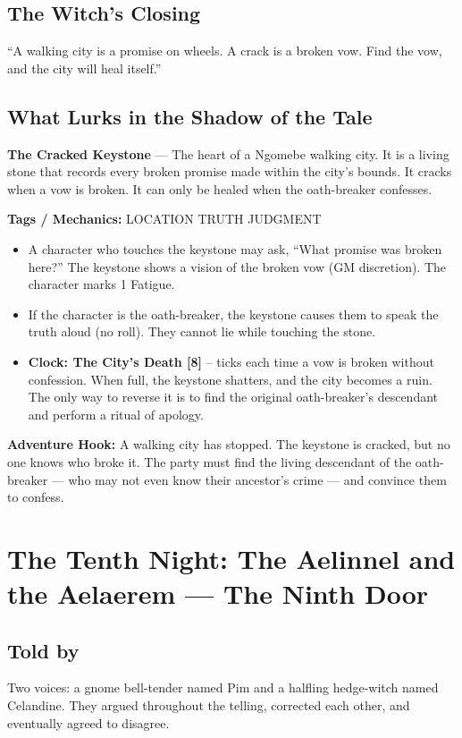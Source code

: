 \documentclass[10pt,twoside]{book}
\newcommand{\tag}[1]{\textsc{#1}}
\begin{document}
\section*{The Witch's Closing}
``A walking city is a promise on wheels. A crack is a broken vow. Find the vow, and the city will heal itself.''

\section*{What Lurks in the Shadow of the Tale}
\begin{infobox}
\textbf{The Cracked Keystone} --- The heart of a Ngomebe walking city. It is a living stone that records every broken promise made within the city's bounds. It cracks when a vow is broken. It can only be healed when the oath-breaker confesses.

\textbf{Tags / Mechanics:} \tag{LOCATION} \tag{TRUTH} \tag{JUDGMENT}

\begin{itemize}
\item A character who touches the keystone may ask, ``What promise was broken here?'' The keystone shows a vision of the broken vow (GM discretion). The character marks 1 Fatigue.
\item If the character is the oath-breaker, the keystone causes them to speak the truth aloud (no roll). They cannot lie while touching the stone.
\item \textbf{Clock: The City's Death [8]} -- ticks each time a vow is broken without confession. When full, the keystone shatters, and the city becomes a ruin. The only way to reverse it is to find the original oath-breaker's descendant and perform a ritual of apology.
\end{itemize}

\textbf{Adventure Hook:} A walking city has stopped. The keystone is cracked, but no one knows who broke it. The party must find the living descendant of the oath-breaker --- who may not even know their ancestor's crime --- and convince them to confess.
\end{infobox}

\chapter{The Tenth Night: The Aelinnel and the Aelaerem --- The Ninth Door}

\section*{Told by}
Two voices: a gnome bell-tender named Pim and a halfling hedge-witch named Celandine. They argued throughout the telling, corrected each other, and eventually agreed to disagree.
\end{document}
